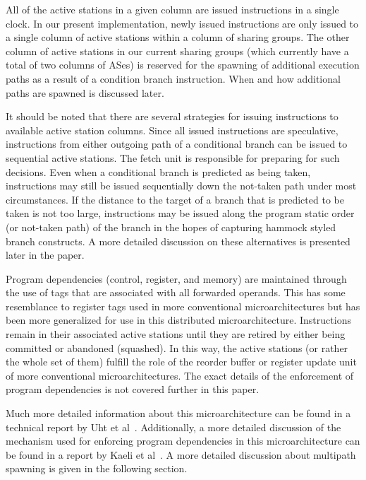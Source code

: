 \documentclass[10pt,dvips]{article}
\begin{document}
All of the active stations in a given column are issued instructions
in a single clock.  
In our present implementation, newly issued instructions
are only issued to a single column of active stations within
a column of sharing groups.  The other column of active stations
in our current sharing groups (which currently have a total
of two columns of ASes) is reserved for the spawning of additional
execution paths as a result of a condition branch instruction.
When and how additional paths are spawned is discussed later.

It should be noted that there are several strategies for
issuing instructions to available active station columns.
Since all issued instructions are speculative, instructions
from either outgoing path of a conditional branch can be issued
to sequential active stations.
The fetch unit is responsible for preparing for such decisions.
Even when a conditional branch is predicted as being taken,
instructions may still be issued sequentially down the not-taken
path under most circumstances.  If the distance to the target 
of a branch
that is predicted to be taken is not too large,
instructions may be issued along the program static order (or not-taken
path) of the branch in the hopes of capturing hammock styled branch
constructs.  A more detailed discussion on these alternatives is
presented later in the paper.

Program dependencies (control, register, and memory) are 
maintained through the use of tags that
are associated with all forwarded operands.
This has some resemblance to register tags used in more conventional 
microarchitectures but has been more generalized for use in this
distributed microarchitecture.  Instructions remain in their
associated active stations until they are retired by either being
committed or abandoned (squashed).  In this way, the active stations
(or rather the whole set of them)
fulfill the role of the reorder buffer or register update unit of more
conventional microarchitectures.
The exact details of the enforcement of program dependencies
is not covered further in this paper.

Much more detailed information about this microarchitecture
can be found in a technical report by Uht et al~\cite{Uht01}.
Additionally, a more detailed discussion of the mechanism used for
enforcing program dependencies in this microarchitecture
can be found in a report by Kaeli et al~\cite{Kaeli01}.
A more detailed discussion about multipath spawning is given
in the following section.
%
\end{document}

